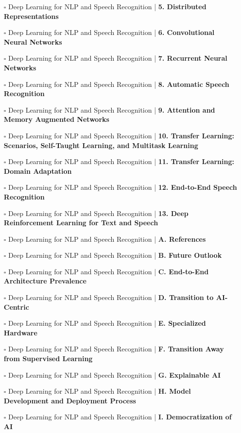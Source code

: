 \documentclass[a4, landscape, 12pt]{article}
\newcommand{\checkbox}{$\square$}%
\begin{document}
\begin{itemize}
{}
\item [\checkbox]  Deep Learning for NLP and Speech Recognition | \textbf{ 5. Distributed Representations
}
\item [\checkbox]  Deep Learning for NLP and Speech Recognition | \textbf{ 6. Convolutional Neural Networks
}
\item [\checkbox]  Deep Learning for NLP and Speech Recognition | \textbf{ 7. Recurrent Neural Networks
}
\item [\checkbox]  Deep Learning for NLP and Speech Recognition | \textbf{ 8. Automatic Speech Recognition
}
\item [\checkbox]  Deep Learning for NLP and Speech Recognition | \textbf{ 9. Attention and Memory Augmented Networks
}
\item [\checkbox]  Deep Learning for NLP and Speech Recognition | \textbf{ 10. Transfer Learning: Scenarios, Self-Taught Learning, and Multitask Learning
}
\item [\checkbox]  Deep Learning for NLP and Speech Recognition | \textbf{ 11. Transfer Learning: Domain Adaptation
}
\item [\checkbox]  Deep Learning for NLP and Speech Recognition | \textbf{ 12. End-to-End Speech Recognition
}
\item [\checkbox]  Deep Learning for NLP and Speech Recognition | \textbf{ 13. Deep Reinforcement Learning for Text and Speech
}
\item [\checkbox]  Deep Learning for NLP and Speech Recognition | \textbf{ A. References
}
\item [\checkbox]  Deep Learning for NLP and Speech Recognition | \textbf{ B. Future Outlook
}
\item [\checkbox]  Deep Learning for NLP and Speech Recognition | \textbf{ C. End-to-End Architecture Prevalence
}
\item [\checkbox]  Deep Learning for NLP and Speech Recognition | \textbf{ D. Transition to AI-Centric
}
\item [\checkbox]  Deep Learning for NLP and Speech Recognition | \textbf{ E. Specialized Hardware
}
\item [\checkbox]  Deep Learning for NLP and Speech Recognition | \textbf{ F. Transition Away from Supervised Learning
}
\item [\checkbox]  Deep Learning for NLP and Speech Recognition | \textbf{ G. Explainable AI
}
\item [\checkbox]  Deep Learning for NLP and Speech Recognition | \textbf{ H. Model Development and Deployment Process
}
\item [\checkbox]  Deep Learning for NLP and Speech Recognition | \textbf{ I. Democratization of AI
}
\end{itemize}
\end{document}
